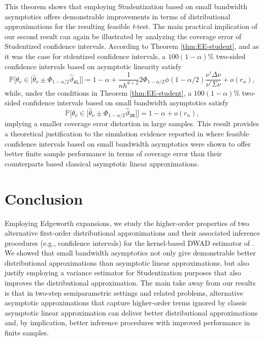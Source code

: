 \documentclass[11pt]{article}
\numberwithin{equation}{section}
\theoremstyle{definition}
\renewcommand{\P}{\mathbb{P}}
\newcommand{\Scale}{\vartheta}
\begin{document}
This theorem shows that employing Studentization based on small bandwidth asymptotics offers demonstrable improvements in terms of distributional approximations for the resulting feasible \textit{t}-test. The main practical implication of our second result can again be illustrated by analyzing the coverage error of Studentized confidence intervals. According to Theorem \ref{thm:EE-student}, and as it was the case for stdentized confidence intervals, a $100(1-\alpha)\%$ two-sided confidence intervals based on asymptotic linearity satisfy
\begin{equation*}
    \P\Big[ \theta_\nu \in \big[ \widehat{\theta}_\nu \pm \Phi_{1-\alpha/2} \widehat{\Scale}_\mathtt{AL}\big] \Big]
    = 1-\alpha + \frac{1}{nh^{d+2}} 2 \Phi_{1-\alpha/2} \phi(1-\alpha/2) \frac{\nu'\Delta\nu}{\nu'\Sigma\nu} + o(r_n),
\end{equation*}
while, under the conditions in Theorem \ref{thm:EE-student}, a $100(1-\alpha)\%$ two-sided confidence intervals based on small bandwidth asymptotics satisfy
\begin{equation*}
    \P\Big[ \theta_\nu \in \big[ \widehat{\theta}_\nu \pm \Phi_{1-\alpha/2} \widehat{\Scale}_\mathtt{SB}\big] \Big]
    = 1-\alpha + o(r_n),
\end{equation*}
implying a smaller coverage error distortion in large samples. This result provides a theoretical justification to the simulation evidence reported in \citet{Cattaneo-Crump-Jansson_2014a_ET,Cattaneo-Crump-Jansson_2014b_ET,Cattaneo-Crump-Jansson_2010_JASA} where feasible confidence intervals based on small bandwidth asymptotics were shown to offer better finite sample performance in terms of coverage error than their counterparts based classical asymptotic linear approximations.

\section{Conclusion}\label{sec: Conclusion}

Employing Edgeworth expansions, we study the higher-order properties of two alternative first-order distributional approximations and their associated inference procedures (e.g., confidence intervals) for the kernel-based DWAD estimator of \citet{Powell-Stock-Stoker_1989_ECMA}. We showed that small bandwidth asymptotics not only give demonstrable better distributional approximations than asymptotic linear approximations, but also justify employing a variance estimator for Studentization purposes that also improves the distributional approximation. The main take away from our results is that in two-step semiparametric settings and related problems, alternative asymptotic approximations that capture higher-order terms ignored by classic asymptotic linear approximation can deliver better distributional approximations and, by implication, better inference procedures with improved performance in finite samples.
\end{document}

